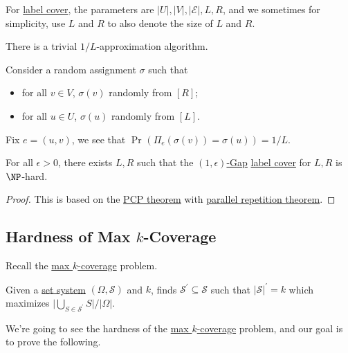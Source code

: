 For \hyperref[prb:label-cover]{label cover}, the parameters are \(\vert U \vert, \vert V \vert , \vert \mathcal{E}  \vert , L, R\), and we sometimes for simplicity, use \(L\) and \(R\) to also denote the size of \(L\) and \(R\).

\begin{remark}[Baseline]
	There is a trivial \(1/L\)-approximation algorithm.
\end{remark}
\begin{explanation}
	Consider a random assignment \(\sigma \) such that
	\begin{itemize}
		\item for all \(v\in V\), \(\sigma (v)\) randomly from \([R]\);
		\item for all \(u\in U\), \(\sigma (u)\) randomly from \([L]\).
	\end{itemize}
	Fix \(e=(u, v)\), we see that \(\Pr_{}(\Pi _e(\sigma (v)) = \sigma (u)) = 1 / L \).
\end{explanation}

\begin{theorem}\label{thm:label-cover}
	For all \(\epsilon > 0\), there exists \(L, R\) such that the \hyperref[def:c-s-Gap]{\((1, \epsilon )\)-Gap} \hyperref[prb:label-cover]{label cover} for \(L, R\) is \(\NP\)-hard.
\end{theorem}
\begin{proof}
	This is based on the \hyperref[thm:PCP]{PCP theorem} with \href{https://www.wisdom.weizmann.ac.il/~/ranraz/publications/Pparrepsur.pdf}{parallel repetition theorem}.
\end{proof}

\subsection{Hardness of Max \(k\)-Coverage}
Recall the \hyperref[prb:max-k-coverage]{max \(k\)-coverage} problem.

\begin{problem}\label{prb:max-k-coverage}
Given a \hyperref[def:set-system]{set system} \((\Omega , \mathcal{S}) \) and \(k\), finds \(\mathcal{S} ^\prime \subseteq \mathcal{S} \) such that \(\vert \mathcal{S}\vert ^\prime = k\) which maximizes \(\vert \bigcup_{S\in \mathcal{S} ^\prime } S \vert / \vert \Omega \vert \).
\end{problem}

We're going to see the hardness of the \hyperref[prb:max-k-coverage]{max \(k\)-coverage} problem, and our goal is to prove the following.

